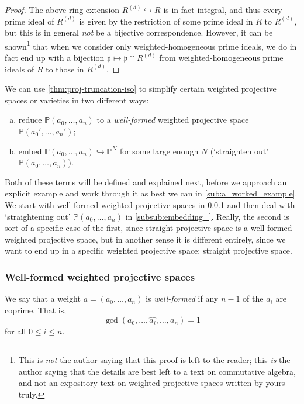 \documentclass[10pt,notitlepage]{article}
\numberwithin{equation}{subsection}
\newcommand{\pee}{\mathbb{P}}
\newcommand{\remove}[1]{\widehat{#1}}
\newcommand{\pazn}{\pee(a_0,\ldots,a_n)}
\newcommand{\prid}{\mathfrak{p}}
\begin{document}
\begin{proof}
            The above ring extension $R^{(d)}\hookrightarrow R$ is in fact integral, and thus every prime ideal of $R^{(d)}$ is given by the restriction of some prime ideal in $R$ to $R^{(d)}$, but this is in general \emph{not} be a bijective correspondence.
            However, it can be shown\footnote{%
                This is \emph{not} the author saying that this proof is left to the reader; this \emph{is} the author saying that the details are best left to a text on commutative algebra, and not an expository text on weighted projective spaces written by yours truly.
            } that when we consider only weighted-homogeneous prime ideals, we do in fact end up with a bijection $\prid\mapsto\prid\cap R^{(d)}$ from weighted-homogeneous prime ideals of $R$ to those in $R^{(d)}$.
        \end{proof}

        We can use \cref{thm:proj-truncation-iso} to simplify certain weighted projective spaces or varieties in two different ways:
        \begin{enumerate}[(a)]
            \item reduce $\pazn$ to a \emph{well-formed} weighted projective space $\pee(a_0',\ldots,a_n')$;
            \item embed $\pazn\hookrightarrow\pee^N$ for some large enough $N$ (`straighten out' $\pazn$).
        \end{enumerate}
        Both of these terms will be defined and explained next, before we approach an explicit example and work through it as best we can in \cref{sub:a_worked_example}.
        We start with well-formed weighted projective spaces in \cref{ssub:well_formed_weighted_projective_spaces} and then deal with `straightening out' $\pazn$ in \cref{subsub:embedding_}.
        Really, the second is sort of a specific case of the first, since straight projective space is a well-formed weighted projective space, but in another sense it is different entirely, since we want to end up in a specific weighted projective space: straight projective space.


        \subsubsection{Well-formed weighted projective spaces} %
        \label{ssub:well_formed_weighted_projective_spaces}

        \begin{definition}
            We say that a weight $a=(a_0,\ldots,a_n)$ is \emph{well-formed} if any $n-1$ of the $a_i$ are coprime.
            That is,
            \[
                \gcd(a_0,\ldots,\remove{a_i},\ldots,a_n) = 1
            \]
            for all $0\leqslant i\leqslant n$.
        \end{definition}
\end{document}
